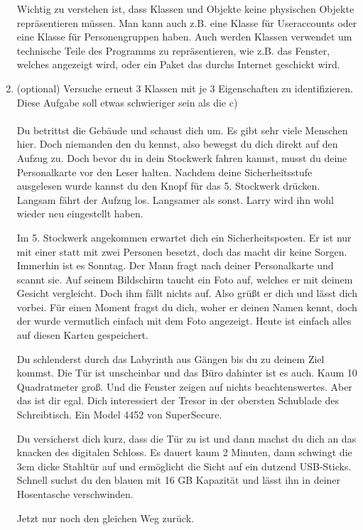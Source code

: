 \begin{enumerate}
    \begin{Infobox}
        Wichtig zu verstehen ist, dass Klassen und Objekte keine physischen Objekte repräsentieren müssen. Man kann auch z.B. eine Klasse für Useraccounts oder eine Klasse für Personengruppen haben. Auch werden Klassen verwendet um technische Teile des Programms zu repräsentieren, wie z.B. das Fenster, welches angezeigt wird, oder ein Paket das durchs Internet geschickt wird.
    \end{Infobox}

    \item (optional) Versuche erneut 3 Klassen mit je 3 Eigenschaften  zu identifizieren. Diese Aufgabe soll etwas schwieriger sein als die c)
    \paragraph{}
    Du betrittst die Gebäude und schaust dich um. Es gibt sehr viele Menschen hier. Doch niemanden den du kennst, also bewegst du dich direkt auf den Aufzug zu. Doch bevor du in dein Stockwerk fahren kannst, musst du deine Personalkarte vor den Leser halten. Nachdem deine Sicherheitsstufe ausgelesen wurde kannst du den Knopf für das 5. Stockwerk drücken. Langsam fährt der Aufzug los. Langsamer als sonst. Larry wird ihn wohl wieder neu eingestellt haben.

    Im 5. Stockwerk angekommen erwartet dich ein Sicherheitsposten. Er ist nur mit einer statt mit zwei Personen besetzt, doch das macht dir keine Sorgen. Immerhin ist es Sonntag. Der Mann fragt nach deiner Personalkarte und scannt sie. Auf seinem Bildschirm taucht ein Foto auf, welches er mit deinem Gesicht vergleicht. Doch ihm fällt nichts auf. Also grüßt er dich und lässt dich vorbei. Für einen Moment fragst du dich, woher er deinen Namen kennt, doch der wurde vermutlich einfach mit dem Foto angezeigt. Heute ist einfach alles auf diesen Karten gespeichert.

    Du schlenderst durch das Labyrinth aus Gängen bis du zu deinem Ziel kommst. Die Tür ist unscheinbar und das Büro dahinter ist es auch. Kaum 10 Quadratmeter groß. Und die Fenster zeigen auf nichts beachtenswertes. Aber das ist dir egal. Dich interessiert der Tresor in der obersten Schublade des Schreibtisch. Ein Model 4452 von SuperSecure.

    Du versicherst dich kurz, dass die Tür zu ist und dann machst du dich an das knacken des digitalen Schloss. Es dauert kaum 2 Minuten, dann schwingt die 3cm dicke Stahltür auf und ermöglicht die Sicht auf ein dutzend USB-Sticks. Schnell suchst du den blauen mit 16 GB Kapazität und lässt ihn in deiner Hosentasche verschwinden.

    Jetzt nur noch den gleichen Weg zurück.
\end{enumerate}
